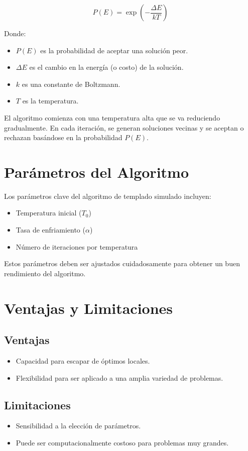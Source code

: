 \documentclass{article}
\begin{document}
\begin{equation}
P(E) = \exp\left(-\frac{\Delta E}{kT}\right)
\end{equation}

Donde:
\begin{itemize}
    \item \( P(E) \) es la probabilidad de aceptar una solución peor.
    \item \( \Delta E \) es el cambio en la energía (o costo) de la solución.
    \item \( k \) es una constante de Boltzmann.
    \item \( T \) es la temperatura.
\end{itemize}

El algoritmo comienza con una temperatura alta que se va reduciendo gradualmente. En cada iteración, se generan soluciones vecinas y se aceptan o rechazan basándose en la probabilidad \( P(E) \).

\section{Parámetros del Algoritmo}
Los parámetros clave del algoritmo de templado simulado incluyen:
\begin{itemize}
    \item Temperatura inicial (\( T_0 \))
    \item Tasa de enfriamiento (\( \alpha \))
    \item Número de iteraciones por temperatura
\end{itemize}

Estos parámetros deben ser ajustados cuidadosamente para obtener un buen rendimiento del algoritmo.

\section{Ventajas y Limitaciones}
\subsection{Ventajas}
\begin{itemize}
    \item Capacidad para escapar de óptimos locales.
    \item Flexibilidad para ser aplicado a una amplia variedad de problemas.
\end{itemize}

\subsection{Limitaciones}
\begin{itemize}
    \item Sensibilidad a la elección de parámetros.
    \item Puede ser computacionalmente costoso para problemas muy grandes.
\end{itemize}
\end{document}
